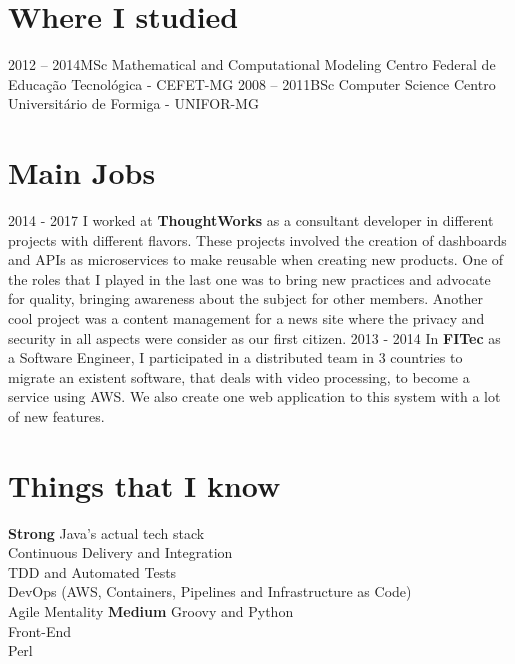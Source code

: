 \documentclass[]{friggeri-cv}
\begin{document}
\section{Where I studied}
\begin{entrylist}
   \entry
    {2012 – 2014}{MSc {} Mathematical and Computational Modeling}{}
    {\normalfont Centro Federal de Educação Tecnológica - CEFET-MG}
  \entry
    {2008 – 2011}{BSc {} Computer Science}{}
    {\normalfont Centro Universitário de Formiga - UNIFOR-MG}
\end{entrylist}

\section{Main Jobs}
    \begin{entrylist}
        \entry
            {2014 - 2017}
            {{\normalfont I worked at \textbf{ThoughtWorks} as a consultant developer in different projects with different flavors.
            These projects involved the creation of dashboards and APIs as microservices to make reusable when creating new products.
            One of the roles that I played in the last one was to bring new practices and advocate for quality, bringing awareness about the subject for other members.
            Another cool project was a content management for a news site where the privacy and security in all aspects were consider as our first citizen.
            }}{}{}
        \entry
            {2013 - 2014}
            {{\normalfont In \textbf{FITec} as a Software Engineer, I participated in a distributed team in 3 countries to migrate an existent software, that deals with video processing, to become a service using AWS. We also create one web application to this system with a lot of new features.
            }}{}{}
    \end{entrylist}
    
\section{Things that I know}
    \begin{entrylist}
        \entry
            {\textbf{Strong}}
            {{\normalfont Java's actual tech stack\\
            Continuous Delivery and Integration\\ 
            TDD and Automated Tests\\
            DevOps (AWS, Containers, Pipelines and Infrastructure as Code)\\ 
            Agile Mentality}}{}{}
        \entry
            {\textbf{Medium}}
            {{\normalfont Groovy and Python\\
            Front-End\\
            Perl
            }}{}{}
    \end{entrylist}
\end{document}

